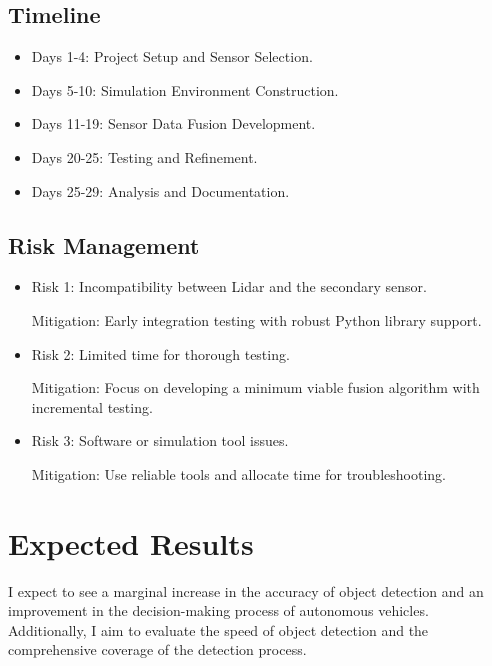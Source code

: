 \documentclass[letterpaper, 10 pt, conference]{ieeeconf}  %
\begin{document}
\subsection{Timeline}
\begin{itemize}
 \item  Days 1-4: Project Setup and Sensor Selection.    

 \item  Days 5-10: Simulation Environment Construction.   

 \item  Days 11-19: Sensor Data Fusion Development.   

 \item  Days 20-25: Testing and Refinement.   

 \item  Days 25-29: Analysis and Documentation.   

\end{itemize}

\subsection{Risk Management}  

\begin{itemize}
 \item Risk 1: Incompatibility between Lidar and the secondary sensor.

Mitigation: Early integration testing with robust Python library support.

 \item Risk 2: Limited time for thorough testing.

Mitigation: Focus on developing a minimum viable fusion algorithm with incremental testing.

 \item Risk 3: Software or simulation tool issues. 

Mitigation: Use reliable tools and allocate time for troubleshooting.
\end{itemize}


\section{Expected Results}

I expect to see a marginal increase in the accuracy of object detection and an improvement in the decision-making process of autonomous vehicles. Additionally, I aim to evaluate the speed of object detection and the comprehensive coverage of the detection process.
\end{document}
